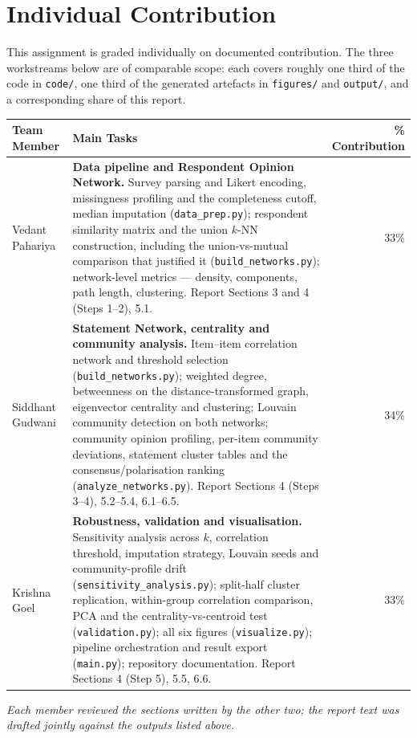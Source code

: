 \documentclass[11pt,a4paper]{article}
\begin{document}
\section{Individual Contribution}\label{sec:contrib}
This assignment is graded individually on documented contribution. The three workstreams below are of comparable scope: each covers roughly one third of the code in \texttt{code/}, one third of the generated artefacts in \texttt{figures/} and \texttt{output/}, and a corresponding share of this report.

\begin{table}[h!]
\centering\footnotesize
\begin{tabular}{>{\raggedright\arraybackslash}p{3.1cm}>{\raggedright\arraybackslash}p{9.3cm}r}
\toprule
\textbf{Team Member} & \textbf{Main Tasks} & \textbf{\% Contribution} \\
\midrule
Vedant Pahariya
& \textbf{Data pipeline and Respondent Opinion Network.} Survey parsing and Likert encoding, missingness profiling and the completeness cutoff, median imputation (\texttt{data\_prep.py}); respondent similarity matrix and the union $k$-NN construction, including the union-vs-mutual comparison that justified it (\texttt{build\_networks.py}); network-level metrics --- density, components, path length, clustering. Report Sections 3 and 4 (Steps 1--2), 5.1.
& 33\% \\
\addlinespace
Siddhant Gudwani
& \textbf{Statement Network, centrality and community analysis.} Item--item correlation network and threshold selection (\texttt{build\_networks.py}); weighted degree, betweenness on the distance-transformed graph, eigenvector centrality and clustering; Louvain community detection on both networks; community opinion profiling, per-item community deviations, statement cluster tables and the consensus/polarisation ranking (\texttt{analyze\_networks.py}). Report Sections 4 (Steps 3--4), 5.2--5.4, 6.1--6.5.
& 34\% \\
\addlinespace
Krishna Goel
& \textbf{Robustness, validation and visualisation.} Sensitivity analysis across $k$, correlation threshold, imputation strategy, Louvain seeds and community-profile drift (\texttt{sensitivity\_analysis.py}); split-half cluster replication, within-group correlation comparison, PCA and the centrality-vs-centroid test (\texttt{validation.py}); all six figures (\texttt{visualize.py}); pipeline orchestration and result export (\texttt{main.py}); repository documentation. Report Sections 4 (Step 5), 5.5, 6.6.
& 33\% \\
\bottomrule
\end{tabular}
\end{table}

\noindent\small\emph{Each member reviewed the sections written by the other two; the report text was drafted jointly against the outputs listed above.}
\end{document}
